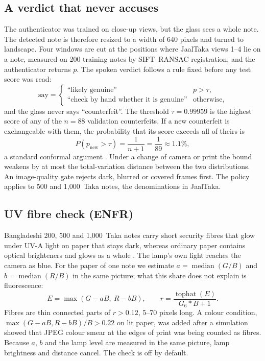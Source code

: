 \documentclass[preprint,12pt]{elsarticle}
\begin{document}
\subsection{A verdict that never accuses}
\label{sec:m_safe}
The authenticator was trained on close-up views, but the glass sees a whole note. The detected note is therefore resized to a width of 640 pixels and turned to landscape. Four windows are cut at the positions where JaalTaka views 1--4 lie on a note, measured on 200 training notes by SIFT--RANSAC registration, and the authenticator returns $p$. The spoken verdict follows a rule fixed before any test score was read:
\begin{equation}
\text{say}=\begin{cases}\text{``likely genuine''} & p>\tau,\\ \text{``check by hand whether it is genuine''} & \text{otherwise,}\end{cases}
\end{equation}
and the glass never says ``counterfeit''. The threshold $\tau=0.99959$ is the highest score of any of the $n=88$ validation counterfeits. If a new counterfeit is exchangeable with them, the probability that its score exceeds all of theirs is
\begin{equation}
P(p_{\mathrm{new}}>\tau)=\frac{1}{n+1}=\frac{1}{89}\approx1.1\%,
\end{equation}
a standard conformal argument \cite{vovk2005}. Under a change of camera or print the bound weakens by at most the total-variation distance between the two distributions. An image-quality gate rejects dark, blurred or covered frames first. The policy applies to 500 and 1,000~Taka notes, the denominations in JaalTaka.

\subsection{UV fibre check (ENFR)}
\label{sec:m_uv}
Bangladeshi 200, 500 and 1,000~Taka notes carry short security fibres that glow under UV-A light on paper that stays dark, whereas ordinary paper contains optical brighteners and glows as a whole \cite{mutanen2003luminescent,ecb2010quickguide}. The lamp's own light reaches the camera as blue. For the paper of one note we estimate $a=\operatorname{median}(G/B)$ and $b=\operatorname{median}(R/B)$ in the same picture; what this share does not explain is fluorescence:
\begin{equation}
E=\max(G-aB,\ R-bB),\qquad r=\frac{\operatorname{tophat}(E)}{G_6*B+1}.
\end{equation}
Fibres are thin connected parts of $r>0.12$, 5--70 pixels long. A colour condition, $\max(G-aB,R-bB)/B>0.22$ on lit paper, was added after a simulation showed that JPEG colour smear at the edges of print was being counted as fibres. Because $a$, $b$ and the lamp level are measured in the same picture, lamp brightness and distance cancel. The check is off by default.
\end{document}
